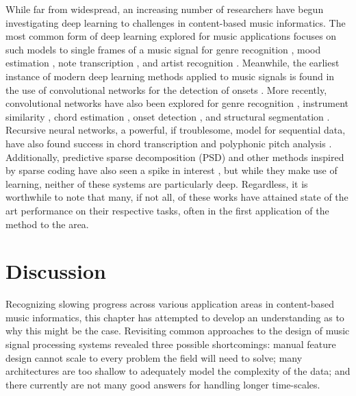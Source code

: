 While far from widespread, an increasing number of researchers have begun investigating deep learning to challenges in content-based music informatics.
The most common form of deep learning explored for music applications focuses on such models to single frames of a music signal for genre recognition \cite{Hamel2009Automatic}, mood estimation \cite{Schmidt2011Modeling}, note transcription \cite{Nam2011Classification}, and artist recognition \cite{Dieleman2011Audio}.
Meanwhile, the earliest instance of modern deep learning methods applied to music signals is found in the use of convolutional networks for the detection of onsets \cite{Lacoste2007Supervised}.
More recently, convolutional networks have also been explored for genre recognition \cite{Li2010Automatic}, instrument similarity \cite{Humphrey2011Nonlinear}, chord estimation \cite{Humphrey2012Learning, Humphrey2012Rethinking}, onset detection \cite{Schluter2014Improved}, and structural segmentation \cite{Ullrich2014Boundary}.
Recursive neural networks, a powerful, if troublesome, model for sequential data, have also found success in chord transcription \cite{Boulanger2013Audio} and polyphonic pitch analysis \cite{Sigtia2014RNN}.
Additionally, predictive sparse decomposition (PSD) and other methods inspired by sparse coding have also seen a spike in interest \cite{Henaff2011Unsupervised, Nam2012Learning}, but while they make use of learning, neither of these systems are particularly deep.
Regardless, it is worthwhile to note that many, if not all, of these works have attained state of the art performance on their respective tasks, often in the first application of the method to the area.



\section{Discussion}
\label{sec:discussion}

Recognizing slowing progress across various application areas in content-based music informatics, this chapter has attempted to develop an understanding as to why this might be the case.
Revisiting common approaches to the design of music signal processing systems revealed three possible shortcomings:
manual feature design cannot scale to every problem the field will need to solve;
many architectures are too shallow to adequately model the complexity of the data;
and there currently are not many good answers for handling longer time-scales.

